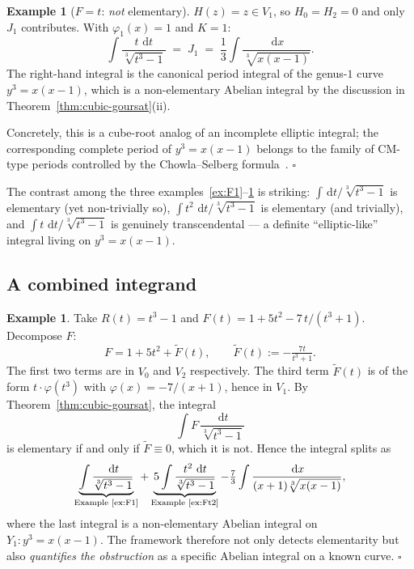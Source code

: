 \documentclass[11pt,a4paper]{article}
\theoremstyle{plain}
\theoremstyle{definition}
\newtheorem{example}[theorem]{Example}
\theoremstyle{remark}
\renewcommand{\d}{\,\mathrm{d}}
\begin{document}
\begin{example}[$F=t$: \emph{not} elementary]\label{ex:Ft}
$H(z)=z\in V_1$, so $H_0=H_2=0$ and only $J_1$ contributes. With $\varphi_1(x)=1$ and $K=1$:
\[
  \int \frac{t\,\d t}{\sqrt[3]{t^3-1}} \;=\; J_1 \;=\; \frac{1}{3}\int \frac{\d x}{\sqrt[3]{x(x-1)}}.
\]
The right-hand integral is the canonical period integral of the genus-$1$ curve $y^3=x(x-1)$, which is a non-elementary Abelian integral by the discussion in Theorem~\ref{thm:cubic-goursat}(ii).

Concretely, this is a cube-root analog of an incomplete elliptic integral; the corresponding complete period of $y^3 = x(x-1)$ belongs to the family of CM-type periods controlled by the Chowla--Selberg formula~\cite{ChowlaSelberg1967,Gross1978}. \hfill$\square$
\end{example}

The contrast among the three examples~\ref{ex:F1}--\ref{ex:Ft} is striking: $\int \d t/\sqrt[3]{t^3-1}$ is elementary (yet non-trivially so), $\int t^2\,\d t/\sqrt[3]{t^3-1}$ is elementary (and trivially), and $\int t\,\d t/\sqrt[3]{t^3-1}$ is genuinely transcendental --- a definite ``elliptic-like'' integral living on $y^3=x(x-1)$.

\subsection{A combined integrand}

\begin{example}\label{ex:combined}
Take $R(t)=t^3-1$ and $F(t) = 1 + 5t^2 - 7\,t/(t^3+1)$. Decompose $F$:
\[
  F = 1 + 5t^2 + \widetilde{F}(t), \qquad \widetilde{F}(t) := -\tfrac{7t}{t^3+1}.
\]
The first two terms are in $V_0$ and $V_2$ respectively. The third term $\widetilde{F}(t)$ is of the form $t\cdot\varphi(t^3)$ with $\varphi(x)=-7/(x+1)$, hence in $V_1$. By Theorem~\ref{thm:cubic-goursat}, the integral
\[
  \int F\,\frac{\d t}{\sqrt[3]{t^3-1}}
\]
is elementary if and only if $\widetilde{F} \equiv 0$, which it is not. Hence the integral splits as
\[
  \underbrace{\int \frac{\d t}{\sqrt[3]{t^3-1}}}_{\text{Example~\ref{ex:F1}}} + \underbrace{5\int \frac{t^2\,\d t}{\sqrt[3]{t^3-1}}}_{\text{Example~\ref{ex:Ft2}}} - \tfrac{7}{3}\int \frac{\d x}{(x+1)\sqrt[3]{x(x-1)}},
\]
where the last integral is a non-elementary Abelian integral on $Y_1\colon y^3=x(x-1)$. The framework therefore not only detects elementarity but also \emph{quantifies the obstruction} as a specific Abelian integral on a known curve.
\hfill$\square$
\end{example}
\end{document}
